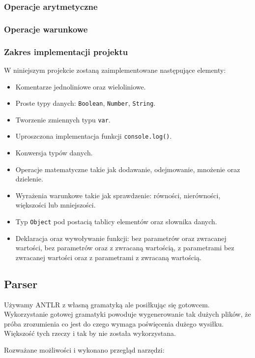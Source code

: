 \documentclass[a4paper]{article}
\begin{document}
\subsubsection{Operacje arytmetyczne}
\subsubsection{Operacje warunkowe}
\subsubsection{Zakres implementacji projektu}
W niniejszym projekcie zostaną zaimplementowane następujące elementy: 
\begin{itemize}
  \item Komentarze jednoliniowe oraz wieloliniowe.
  \item Proste typy danych: \texttt{Boolean}, \texttt{Number}, \texttt{String}.
  \item Tworzenie zmiennych typu \texttt{var}.
  \item Uproszczona implementacja funkcji \texttt{console.log()}.
  \item Konwersja typów danych.
  \item Operacje matematyczne takie jak dodawanie, odejmowanie, mnożenie oraz dzielenie.
  \item Wyrażenia warunkowe takie jak sprawdzenie: równości, nierówności, większości lub mniejszości.
  \item Typ \texttt{Object} pod postacią tablicy elementów oraz słownika danych.
  \item Deklaracja oraz wywoływanie funkcji: bez parametrów oraz zwracanej wartości, bez parametrów oraz z zwracaną wartością, z parametrami bez zwracanej wartości oraz z parametrami z zwracaną wartością.
\end{itemize}


\subsection{Parser}
Używamy ANTLR z własną gramatyką ale posiłkując się gotowcem. Wykorzystanie gotowej gramatyki powoduje wygenerowanie tak dużych plików, że próba zrozumienia co jest do czego wymaga poświęcenia dużego wysiłku. Większość tych rzeczy i tak by nie została wykorzystana.

Rozważane możliwości i wykonano przegląd narzędzi:
\end{document}
